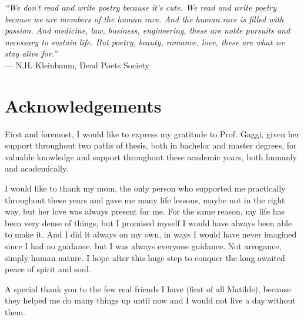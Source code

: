 \cleardoublepage
{}
{}

\begin{flushright}{
    \slshape
    ``We don't read and write poetry because it's cute. We read and write poetry because we are members of the human race. And the human race is filled with passion. And medicine, law, business, engineering, these are noble pursuits and necessary to sustain life. But poetry, beauty, romance, love, these are what we stay alive for.''} \\
    \medskip
    --- N.H. Kleinbaum, Dead Poets Society
\end{flushright}

\begingroup
\let\clearpage\relax
\let\cleardoublepage\relax
\let\cleardoublepage\relax

\chapter*{Acknowledgements}

\noindent First and foremost, I would like to express my gratitude to Prof. Gaggi, given her support throughout two paths of thesis, both in bachelor and master degrees, for valuable knowledge and support throughout these academic years, both humanly and academically. 

\vspace{0.35cm}

\noindent I would like to thank my mom, the only person who supported me practically throughout these years and gave me many life lessons, maybe not in the right way, but her love was always present for me. For the same reason, my life has been very dense of things, but I promised myself I would have always been able to make it. And I did it always on my own, in ways I would have never imagined since I had no guidance, but I was always everyone guidance. Not arrogance, simply human nature. I hope after this huge step to conquer the long awaited peace of spirit and soul. 

\vspace{0.35cm}

\noindent A special thank you to the few real friends I have (first of all Matilde), because they helped me do many things up until now and I would not live a day without them.

\vspace{0.75cm}

\noindent{\myLocation, \myTime}
\hfill \textit{\myName}

\endgroup
